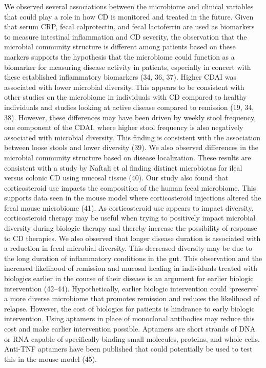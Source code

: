 \documentclass[11pt,]{article}
\begin{document}
We observed several associations between the microbiome and clinical
variables that could play a role in how CD is monitored and treated in
the future. Given that serum CRP, fecal calprotectin, and fecal
lactoferrin are used as biomarkers to measure intestinal inflammation
and CD severity, the observation that the microbial community structure
is different among patients based on these markers supports the
hypothesis that the microbiome could function as a biomarker for
measuring disease activity in patients, especially in concert with these
established inflammatory biomarkers (34, 36, 37). Higher CDAI was
associated with lower microbial diversity. This appears to be consistent
with other studies on the microbiome in individuals with CD compared to
healthy individuals and studies looking at active disease compared to
remission (19, 34, 38). However, these differences may have been driven
by weekly stool frequency, one component of the CDAI, where higher stool
frequency is also negatively associated with microbial diversity. This
finding is consistent with the association between loose stools and
lower diversity (39). We also observed differences in the microbial
community structure based on disease localization. These results are
consistent with a study by Naftali et al finding distinct microbiotas
for ileal versus colonic CD using mucosal tissue (40). Our study also
found that corticosteroid use impacts the composition of the human fecal
microbiome. This supports data seen in the mouse model where
corticosteroid injections altered the fecal mouse microbiome (41). As
corticosteroid use appears to impact diversity, corticosteroid therapy
may be useful when trying to positively impact microbial diversity
during biologic therapy and thereby increase the possibility of response
to CD therapies. We also observed that longer disease duration is
associated with a reduction in fecal microbial diversity. This decreased
diversity may be due to the long duration of inflammatory conditions in
the gut. This observation and the increased likelihood of remission and
mucosal healing in individuals treated with biologics earlier in the
course of their disease is an argument for earlier biologic intervention
(42--44). Hypothetically, earlier biologic intervention could `preserve'
a more diverse microbiome that promotes remission and reduces the
likelihood of relapse. However, the cost of biologics for patients is
hindrance to early biologic intervention. Using aptamers in place of
monoclonal antibodies may reduce this cost and make earlier intervention
possible. Aptamers are short strands of DNA or RNA capable of
specifically binding small molecules, proteins, and whole cells.
Anti-TNF aptamers have been published that could potentially be used to
test this in the mouse model (45).
\end{document}
